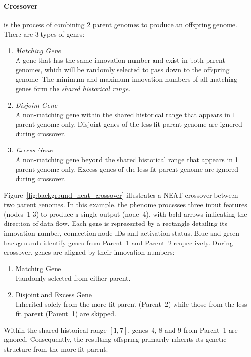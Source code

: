 \paragraph{Crossover} is the process of combining 2 parent genomes to produce an offspring genome. There are 3 types of genes: 
\begin{enumerate}
    \item \textit{Matching Gene} \\
    A gene that has the same innovation number and exist in both parent genomes, which will be randomly selected to pass down to the offspring genome. The minimum and maximum innovation numbers of all matching genes form the \textit{shared historical range}. 

    \item \textit{Disjoint Gene} \\
    A non-matching gene within the shared historical range that appears in 1 parent genome only. Disjoint genes of the less-fit parent genome are ignored during crossover. 

    \item \textit{Excess Gene} \\
    A non-matching gene beyond the shared historical range that appears in 1 parent genome only. Excess genes of the less-fit parent genome are ignored during crossover. 
\end{enumerate}

Figure~\ref{fig:background_neat_crossover} illustrates a NEAT crossover between two parent genomes. In this example, the phenome processes three input features (nodes~1-3) to produce a single output (node~4), with bold arrows indicating the direction of data flow. 
Each gene is represented by a rectangle detailing its innovation number, connection node IDs and activation status. Blue and green backgrounds identify genes from Parent~1 and Parent~2 respectively. 
During crossover, genes are aligned by their innovation numbers: 
\begin{enumerate}
    \item Matching Gene \\
    Randomly selected from either parent. 

    \item Disjoint and Excess Gene \\
    Inherited solely from the more fit parent (Parent~2) while those from the less fit parent (Parent~1) are skipped. 
\end{enumerate}

Within the shared historical range $[1, 7]$, genes~4, 8 and 9 from Parent~1 are ignored. Consequently, the resulting offspring primarily inherits its genetic structure from the more fit parent. 


